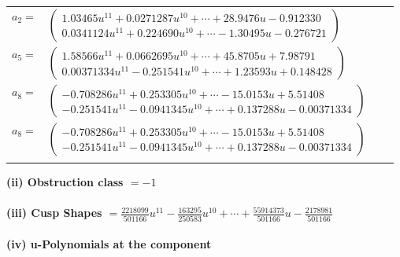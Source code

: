 \documentclass[1p]{elsarticle_modified}
\theoremstyle{definition}
\begin{document}
\begin{tabular}{m{7pt} m{180pt} m{7pt} m{180pt} }
\flushright $a_{2}=$&$\begin{pmatrix}1.03465 u^{11}+0.0271287 u^{10}+\cdots+28.9476 u-0.912330\\0.0341124 u^{11}+0.224690 u^{10}+\cdots-1.30495 u-0.276721\end{pmatrix}$ \\
\flushright $a_{5}=$&$\begin{pmatrix}1.58566 u^{11}+0.0662695 u^{10}+\cdots+45.8705 u+7.98791\\0.00371334 u^{11}-0.251541 u^{10}+\cdots+1.23593 u+0.148428\end{pmatrix}$ \\
\flushright $a_{8}=$&$\begin{pmatrix}-0.708286 u^{11}+0.253305 u^{10}+\cdots-15.0153 u+5.51408\\-0.251541 u^{11}-0.0941345 u^{10}+\cdots+0.137288 u-0.00371334\end{pmatrix}$\\ \flushright $a_{8}=$&$\begin{pmatrix}-0.708286 u^{11}+0.253305 u^{10}+\cdots-15.0153 u+5.51408\\-0.251541 u^{11}-0.0941345 u^{10}+\cdots+0.137288 u-0.00371334\end{pmatrix}$\\&\end{tabular}
\flushleft \textbf{(ii) Obstruction class $= -1$}\\~\\
\flushleft \textbf{(iii) Cusp Shapes $= \frac{2218099}{501166} u^{11}-\frac{163295}{250583} u^{10}+\cdots+\frac{55914373}{501166} u-\frac{2178981}{501166}$}\\~\\
\newpage\renewcommand{\arraystretch}{1}
\flushleft \textbf{(iv) u-Polynomials at the component}\newline \\
\end{document}

